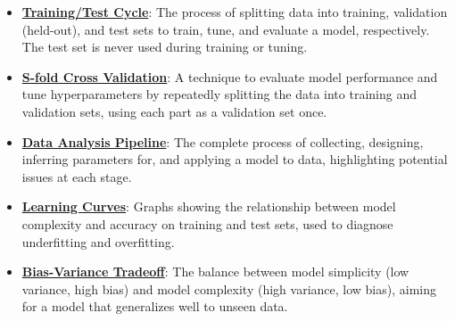 \documentclass{article}%
\begin{document}
\begin{itemize}[leftmargin=*]
\item \href{https://www.math.purdue.edu/~yipn/351/10L1-CrossValidation.pdf#page=5}{\textbf{Training/Test Cycle}}: The process of splitting data into training, validation (held-out), and test sets to train, tune, and evaluate a model, respectively. The test set is never used during training or tuning.%
\item \href{https://www.math.purdue.edu/~yipn/351/10L1-CrossValidation.pdf#page=25}{\textbf{S-fold Cross Validation}}: A technique to evaluate model performance and tune hyperparameters by repeatedly splitting the data into training and validation sets, using each part as a validation set once.%
\item \href{https://www.math.purdue.edu/~yipn/351/10L1-CrossValidation.pdf#page=26}{\textbf{Data Analysis Pipeline}}: The complete process of collecting, designing, inferring parameters for, and applying a model to data, highlighting potential issues at each stage.%
\item \href{https://www.math.purdue.edu/~yipn/351/10L1-CrossValidation.pdf#page=20}{\textbf{Learning Curves}}: Graphs showing the relationship between model complexity and accuracy on training and test sets, used to diagnose underfitting and overfitting.%
\item \href{https://www.math.purdue.edu/~yipn/351/10L1-CrossValidation.pdf#page=4}{\textbf{Bias-Variance Tradeoff}}: The balance between model simplicity (low variance, high bias) and model complexity (high variance, low bias), aiming for a model that generalizes well to unseen data.%
\end{itemize}

%
\end{document}
